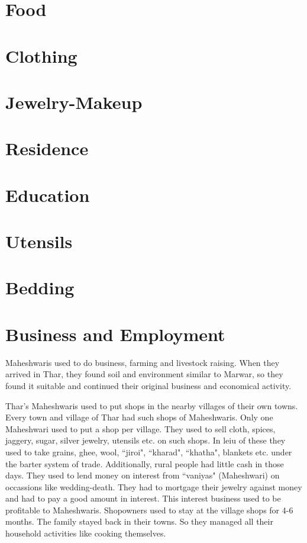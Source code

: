 \section{Food}
\section{Clothing}
\section{Jewelry-Makeup}
\section{Residence}
\section{Education}
\section{Utensils}
\section{Bedding}
\section{Business and Employment}
Maheshwaris used to do business, farming and livestock raising. When they arrived in Thar, they found soil and environment similar to Marwar, so they found it suitable and continued their original business and economical activity.

Thar's Maheshwaris used to put shops in the nearby villages of their own towns. Every town and village of Thar had such shops of Maheshwaris. Only one Maheshwari used to put a shop per village. They used to sell cloth, spices, jaggery, sugar, silver jewelry, utensils etc. on such shops. In leiu of these they used to take grains, ghee, wool, ``jiroi", ``kharad", ``khatha", blankets etc. under the barter system of trade. Additionally, rural people had little cash in those days. They used to lend money on interest from ``vaniyas" (Maheshwari) on occassions like wedding-death. They had to mortgage their jewelry against money and had to pay a good amount in interest. This interest business used to be profitable to Maheshwaris. Shopowners used to stay at the village shops for 4-6 months. The family stayed back in their towns. So they managed all their household activities like cooking themselves.

